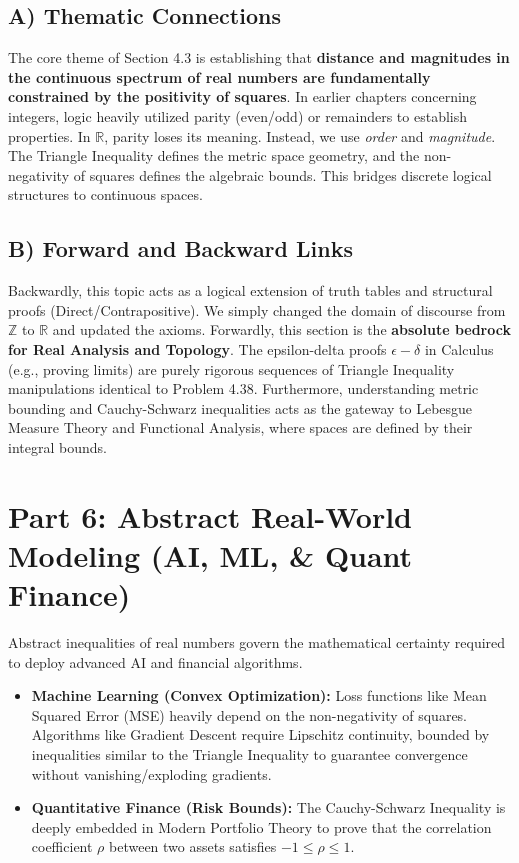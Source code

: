 \documentclass[11pt]{article}
\theoremstyle{definition}
\theoremstyle{remark}
\begin{document}
\begin{itemize}
\subsection{A) Thematic Connections}
The core theme of Section 4.3 is establishing that \textbf{distance and magnitudes in the continuous spectrum of real numbers are fundamentally constrained by the positivity of squares}. In earlier chapters concerning integers, logic heavily utilized parity (even/odd) or remainders to establish properties. In $\mathbb{R}$, parity loses its meaning. Instead, we use \textit{order} and \textit{magnitude}. The Triangle Inequality defines the metric space geometry, and the non-negativity of squares defines the algebraic bounds. This bridges discrete logical structures to continuous spaces.

\subsection{B) Forward and Backward Links}
Backwardly, this topic acts as a logical extension of truth tables and structural proofs (Direct/Contrapositive). We simply changed the domain of discourse from $\mathbb{Z}$ to $\mathbb{R}$ and updated the axioms. 
Forwardly, this section is the \textbf{absolute bedrock for Real Analysis and Topology}. The epsilon-delta proofs $\epsilon-\delta$ in Calculus (e.g., proving limits) are purely rigorous sequences of Triangle Inequality manipulations identical to Problem 4.38. Furthermore, understanding metric bounding and Cauchy-Schwarz inequalities acts as the gateway to Lebesgue Measure Theory and Functional Analysis, where spaces are defined by their integral bounds.

\section{Part 6: Abstract Real-World Modeling (AI, ML, \& Quant Finance)}

Abstract inequalities of real numbers govern the mathematical certainty required to deploy advanced AI and financial algorithms. 
\begin{itemize}
    \item \textbf{Machine Learning (Convex Optimization):} Loss functions like Mean Squared Error (MSE) heavily depend on the non-negativity of squares. Algorithms like Gradient Descent require Lipschitz continuity, bounded by inequalities similar to the Triangle Inequality to guarantee convergence without vanishing/exploding gradients.
    \item \textbf{Quantitative Finance (Risk Bounds):} The Cauchy-Schwarz Inequality is deeply embedded in Modern Portfolio Theory to prove that the correlation coefficient $\rho$ between two assets satisfies $-1 \le \rho \le 1$.
\end{itemize}


\end{itemize}
\end{document}
